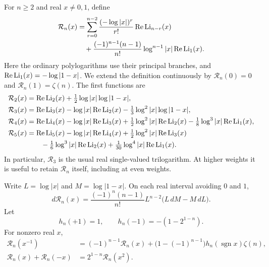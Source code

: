 For $n\ge2$ and real $x\ne0,1$, define
\begin{align}
 \mathcal R_n(x)
 &=\sum_{r=0}^{n-2}\frac{(-\log|x|)^r}{r!}
                  \operatorname{Re}\operatorname{Li}_{n-r}(x)\notag\\
 &\quad+\frac{(-1)^{n-1}(n-1)}{n!}
           \log^{n-1}|x|\operatorname{Re}\operatorname{Li}_1(x).
 \label{gold:eq:R-definition}
\end{align}
Here the ordinary polylogarithms use their principal branches, and
$\operatorname{Re}\operatorname{Li}_1(x)=-\log|1-x|$.  We extend the definition
continuously by $\mathcal R_n(0)=0$ and $\mathcal R_n(1)=\zeta(n)$.
The first functions are
\begin{align*}
 \mathcal R_2(x)&=\operatorname{Re}\operatorname{Li}_2(x)
                +\tfrac12\log|x|\log|1-x|,\\
 \mathcal R_3(x)&=\operatorname{Re}\operatorname{Li}_3(x)
                -\log|x|\operatorname{Re}\operatorname{Li}_2(x)
                -\tfrac13\log^2|x|\log|1-x|,\\
 \mathcal R_4(x)&=\operatorname{Re}\operatorname{Li}_4(x)
                -\log|x|\operatorname{Re}\operatorname{Li}_3(x)
                +\tfrac12\log^2|x|\operatorname{Re}\operatorname{Li}_2(x)
                -\tfrac18\log^3|x|\operatorname{Re}\operatorname{Li}_1(x),\\
 \mathcal R_5(x)&=\operatorname{Re}\operatorname{Li}_5(x)
                -\log|x|\operatorname{Re}\operatorname{Li}_4(x)
                +\tfrac12\log^2|x|\operatorname{Re}\operatorname{Li}_3(x)\\
 &\qquad-\tfrac16\log^3|x|\operatorname{Re}\operatorname{Li}_2(x)
                +\tfrac1{30}\log^4|x|\operatorname{Re}\operatorname{Li}_1(x).
\end{align*}
In particular, $\mathcal R_3$ is the usual real single-valued
trilogarithm.  At higher weights it is useful to retain
$\mathcal R_n$ itself, including at even weights.

\begin{lemma}
\label{gold:lem:R}
Write $L=\log|x|$ and $M=\log|1-x|$.  On each real interval avoiding
$0$ and $1$,
\begin{equation}
 d\mathcal R_n(x)
   =\frac{(-1)^n(n-1)}{n!}
       L^{n-2}\bigl(L\,dM-M\,dL\bigr).
 \label{gold:eq:R-derivative}
\end{equation}
Let
\[
 h_n(+1)=1,\qquad h_n(-1)=-(1-2^{1-n}).
\]
For nonzero real $x$,
\begin{align}
 \mathcal R_n(x^{-1})
 &=(-1)^{n-1}\mathcal R_n(x)
   +\bigl(1-(-1)^{n-1}\bigr)h_n(\operatorname{sgn}x)\zeta(n),
 \label{gold:eq:R-inversion}\\
 \mathcal R_n(x)+\mathcal R_n(-x)
 &=2^{1-n}\mathcal R_n(x^2).
 \label{gold:eq:R-duplication}
\end{align}
\end{lemma}

